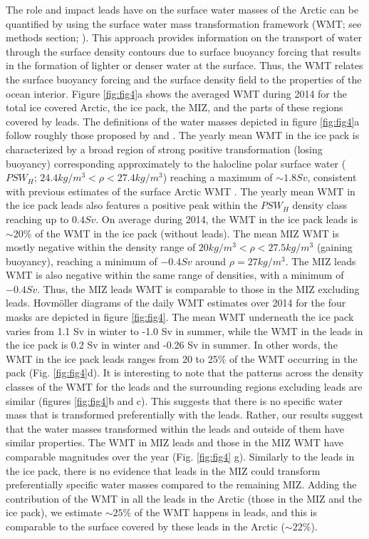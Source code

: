 \documentclass[lineno,sn-basic]{sn-jnl}%
\begin{document}
The role and impact leads have on the surface water masses of the Arctic can be quantified by using the surface water mass transformation framework (WMT; see methods section; \citealp{Walin_WMT_1982}). This approach provides information on the transport of water through the surface density contours due to surface buoyancy forcing that results in the formation of lighter or denser water at the surface. Thus, the WMT relates the surface buoyancy forcing and the surface density field to the properties of the ocean interior. 
Figure \ref{fig:fig4}a shows the averaged WMT during 2014 for the total ice covered Arctic, the ice pack, the MIZ, and the parts of these regions covered by leads. The definitions of the water masses depicted in figure \ref{fig:fig4}a follow roughly those proposed by \citealt{Pemberton_WMT_2015} and \citealt{Lansard_water_mass_2012}.
The yearly mean WMT in the ice pack is characterized by a broad region of strong positive transformation (losing buoyancy) corresponding approximately to the halocline polar surface water ($PSW_{H}$; $24.4 kg/m^3 < \rho < 27.4 kg/m^3$) reaching a maximum of $\sim 1.8 Sv$, consistent with previous estimates of the surface Arctic WMT \citep{Pemberton_WMT_2015}.
The yearly mean WMT in the ice pack leads also features a positive peak within the $PSW_{H}$ density class reaching up to $0.4 Sv$. On average during 2014, the WMT in the ice pack leads is $\sim 20\%$ of the WMT in the ice pack (without leads). The mean MIZ WMT is mostly negative within the density range of $20 kg/m^3 < \rho < 27.5 kg/m^3$ (gaining buoyancy), reaching a minimum of $-0.4 Sv$ around $\rho = 27 kg/m^3$. The MIZ leads WMT is also negative within the same range of densities, with a minimum of $-0.4 Sv$. Thus, the MIZ leads WMT is comparable to those in the MIZ excluding leads. 
Hovm\"oller diagrams of the daily WMT estimates over 2014 for the four masks are depicted in figure \ref{fig:fig4}.
The mean WMT underneath the ice pack varies from 1.1 Sv in winter to -1.0 Sv in summer, while the WMT in the leads in the ice pack is 0.2 Sv in winter and -0.26 Sv in summer. In other words, the WMT in the ice pack leads ranges from 20 to 25\% of the WMT occurring in the pack (Fig. \ref{fig:fig4}d). It is interesting to note that the patterns across the density classes of the WMT for the leads and the surrounding regions excluding leads are similar (figures \ref{fig:fig4}b and c). This suggests that there is no specific water mass that is transformed preferentially with the leads. Rather, our results suggest that the water masses transformed within the leads and outside of them have similar properties. 
The WMT in MIZ leads and those in the MIZ WMT have comparable magnitudes over the year (Fig. \ref{fig:fig4} g). Similarly to the leads in the ice pack, there is no evidence that leads in the MIZ could transform preferentially specific water masses compared to the remaining MIZ. 
Adding the contribution of the WMT in all the leads in the Arctic (those in the MIZ and the ice pack), we estimate $\sim 25\%$ of the WMT happens in leads, and this is comparable to the surface covered by these leads in the Arctic ($\sim 22\%$). 
\end{document}
